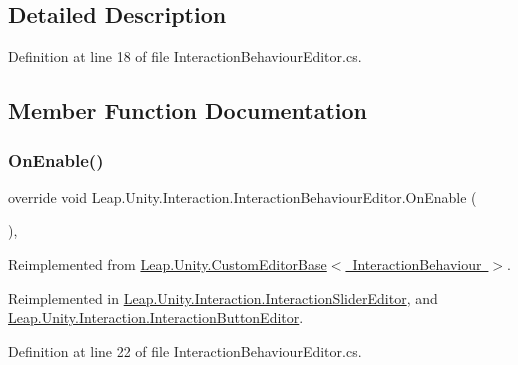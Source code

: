 \subsection{Detailed Description}


Definition at line 18 of file Interaction\+Behaviour\+Editor.\+cs.



\subsection{Member Function Documentation}
\mbox{\label{class_leap_1_1_unity_1_1_interaction_1_1_interaction_behaviour_editor_ab79cc92b11713942f5e3453789317297}} 
\subsubsection{\texorpdfstring{OnEnable()}{OnEnable()}}
{\footnotesize\ttfamily override void Leap.\+Unity.\+Interaction.\+Interaction\+Behaviour\+Editor.\+On\+Enable (\begin{DoxyParamCaption}{ }\end{DoxyParamCaption})\hspace{0.3cm}{\ttfamily [protected]}, {\ttfamily [virtual]}}



Reimplemented from \mbox{\hyperlink{class_leap_1_1_unity_1_1_custom_editor_base_a2268bc01655342bd3da5ae015bfa2f93}{Leap.\+Unity.\+Custom\+Editor\+Base$<$ Interaction\+Behaviour $>$}}.



Reimplemented in \mbox{\hyperlink{class_leap_1_1_unity_1_1_interaction_1_1_interaction_slider_editor_a01649ae644e16c97e44c6e54a40b8e30}{Leap.\+Unity.\+Interaction.\+Interaction\+Slider\+Editor}}, and \mbox{\hyperlink{class_leap_1_1_unity_1_1_interaction_1_1_interaction_button_editor_acabb30b7d288e4c778168cb3e9d712d7}{Leap.\+Unity.\+Interaction.\+Interaction\+Button\+Editor}}.



Definition at line 22 of file Interaction\+Behaviour\+Editor.\+cs.

\mbox{\label{class_leap_1_1_unity_1_1_interaction_1_1_interaction_behaviour_editor_afa4ad41f5b9616fca03ff68ad9835fa8}} 
